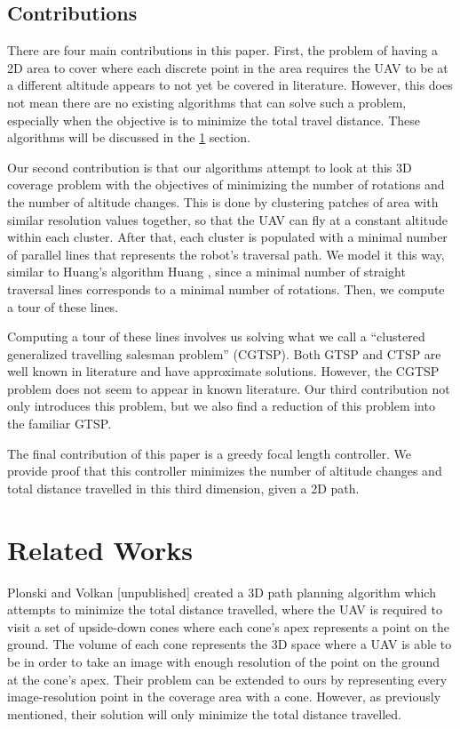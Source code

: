 \documentclass[conference]{IEEEtran}
\theoremstyle{plain}%
\begin{document}
\subsection{Contributions}
There are four main contributions in this paper. First, the problem of having a 2D area to cover where each discrete point in the area requires the UAV to be at a different altitude appears to not yet be covered in literature. However, this does not mean there are no existing algorithms that can solve such a problem, especially when the objective is to minimize the total travel distance. These algorithms will be discussed in the \ref{Related Works} section.

Our second contribution is that our algorithms attempt to look at this 3D coverage problem with the objectives of minimizing the number of rotations and the number of altitude changes. This is done by clustering patches of area with similar resolution values together, so that the UAV can fly at a constant altitude within each cluster. After that, each cluster is populated with a minimal number of parallel lines that represents the robot's traversal path. We model it this way, similar to Huang's algorithm Huang \cite{huang2001optimal}, since a minimal number of straight traversal lines corresponds to a minimal number of rotations. Then, we compute a tour of these lines.

Computing a tour of these lines involves us solving what we call a ``clustered generalized travelling salesman problem'' (CGTSP). Both GTSP and CTSP are well known in literature and have approximate solutions. However, the CGTSP problem does not seem to appear in known literature. Our third contribution not only introduces this problem, but we also find a reduction of this problem into the familiar GTSP.

The final contribution of this paper is a greedy focal length controller. We provide proof that this controller minimizes the number of altitude changes and total distance travelled in this third dimension, given a 2D path.


\section{Related Works} \label{Related Works}
Plonski and Volkan {\color{red}[unpublished]} created a 3D path planning algorithm which attempts to minimize the total distance travelled, where the UAV is required to visit a set of upside-down cones where each cone's apex represents a point on the ground. The volume of each cone represents the 3D space where a UAV is able to be in order to take an image with enough resolution of the point on the ground at the cone's apex. Their problem can be extended to ours by representing every image-resolution point in the coverage area with a cone. However, as previously mentioned, their solution will only minimize the total distance travelled.
\end{document}

